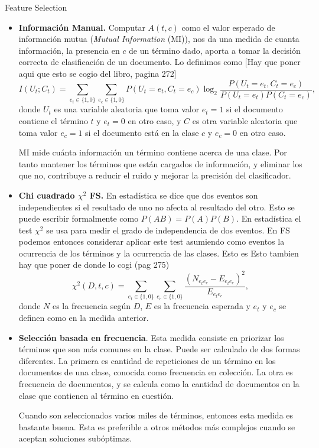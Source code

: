 \documentclass{llncs}
\begin{document}
\begin{subsection}{Feature Selection}
		\begin{itemize}
			\item\textbf{Informaci\'on Manual.}
				Computar $A(t,c)$ como el valor esperado de informaci\'on mutua (\emph{Mutual Information} (MI)), nos da una medida de cuanta informaci\'on, la presencia en $c$ de un t\'ermino dado, aporta a tomar la decisi\'on correcta de clasificaci\'on de un documento. Lo definimos como \color{red}[Hay que poner aqui que esto se cogio del libro, pagina 272]\color{black}
				\[
					I(U_t;C_t) = \sum_{e_t \in \{ 1,0 \} } \sum_{e_c \in \{ 1,0 \} } P( U_t = e_t, C_t = e_c) \log_2 \frac{P (U_t = e_t, C_t = e_c) }{ P(U_t = e_t) P(C_t = e_c) },
				\]
				donde $U_t$ es una variable aleatoria que toma valor $e_t = 1$ si el documento contiene el t\'ermino $t$ y $e_t = 0$ en otro caso, y $C$ es otra variable aleatoria que toma valor $e_c = 1$ si el documento est\'a en la clase $c$ y $e_c = 0  $ en otro caso. 
	
				MI mide cu\'anta informaci\'on un t\'ermino contiene acerca de una clase. Por tanto mantener los t\'erminos que est\'an cargados de informaci\'on, y eliminar los que no, contribuye a reducir el ruido y mejorar la precisi\'on del clasificador.
	
			\item\textbf{Chi cuadrado $\chi^2$ FS.} En estad\'istica se dice que dos eventos son independientes si el resultado de uno no afecta al resultado del otro. Esto se puede escribir formalmente como $P(AB) = P(A) P(B)$. En estad\'istica el test $\chi^2$ se usa para medir el grado de independencia de dos eventos. En FS podemos entonces considerar aplicar este test asumiendo como eventos la ocurrencia de los t\'erminos y la ocurrencia de las clases. Esto es \color{red} Esto tambien hay que poner de donde lo cogi (pag 275)\color{black} 
			\[
				\chi^2(D,t,c) = \sum_{e_t\in \{ 1, 0 \}} \sum_{e_c\in \{ 1, 0 \}} \frac{(N_{e_te_c} - E_{e_t e_c}) ^2 } { E_{e_t e_c}},
			\]
			donde $N$ es la frecuencia seg\'un $D$, $E$ es la frecuencia esperada y $e_t$ y  $e_c$ se definen como en la medida anterior.
			
			\item \textbf{Selecci\'on basada en frecuencia}. Esta medida consiste en priorizar los t\'erminos que son m\'as comunes en la  clase. Puede ser calculado de dos formas diferentes. La primera es cantidad de repeticiones de un t\'ermino en los documentos de una clase, conocida como frecuencia en colecci\'on. La otra es frecuencia de documentos, y se calcula como la cantidad de documentos en la clase que contienen al t\'ermino en cuesti\'on.
			
			Cuando son seleccionados varios miles de t\'erminos, entonces esta medida es bastante buena. Esta es preferible a otros m\'etodos m\'as complejos cuando se aceptan soluciones sub\'optimas.
			
		\end{itemize}
	\end{subsection}
	
\end{document}
